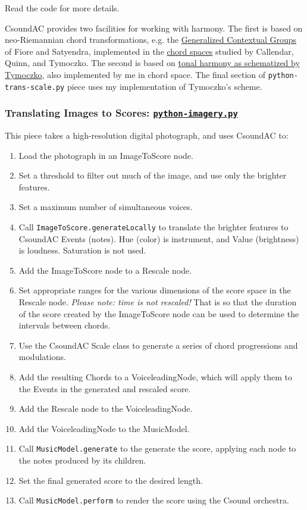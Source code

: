 \documentclass[letterpaper,10pt,DIV=12,parskip=half]{scrartcl}
\begin{document}
Read the code for more details.

\begin{canaryframed}
CsoundAC provides two facilities for working with harmony. The first is based on neo-Riemannian chord transformations, e.g. the \href{https://www.mtosmt.org/issues/mto.05.11.3/mto.05.11.3.fiore_satyendra.pdf}{Generalized Contextual Groups} of Fiore and Satyendra, implemented in the \href{https://dmitri.mycpanel.princeton.edu/files/publications/science2.pdf}{chord spaces} studied by Callendar, Quinn, and Tymoczko. The second is based on \href{https://doi.org/10.1093/oso/9780197577103.001.0001}{tonal harmony as schematized by Tymoczko}, also implemented by me in chord space. The final section of \lstinline|python-trans-scale.py| piece uses my implementation of Tymoczko's scheme.
\end{canaryframed}

\subsubsection{Translating Images to Scores:  \href{https://github.com/gogins/csound-ac/blob/master/user-guide/python-imagery.py}{\lstinline|python-imagery.py|}}

This piece takes a high-resolution digital photograph, and uses CsoundAC to:

\begin{enumerate}
\item Load the photograph in an ImageToScore node.
\item Set a threshold to filter out much of the image, and use only the brighter features.
\item Set a maximum number of simultaneous voices.
\item Call \lstinline|ImageToScore.generateLocally| to translate the brighter features to CsoundAC Events (notes). Hue (color) is instrument, and Value (brightness) is loudness. Saturation is not used.
\item Add the ImageToScore node to a Rescale node.
\item Set appropriate ranges for the various dimensions of the score space in the Rescale node. \emph{Please note: time is not rescaled!} That is so that the duration of the score created by the ImageToScore node can be used to determine the intervals between chords.
\item Use the CsoundAC Scale class to generate a series of chord progressions and modulations.
\item Add the resulting Chords to a VoiceleadingNode, which will apply them to the Events in the generated and rescaled score.
\item Add the Rescale node to the VoiceleadingNode.
\item Add the VoiceleadingNode to the MusicModel.
\item Call \lstinline|MusicModel.generate| to the generate the score, applying each node to the notes produced by its children.
\item Set the final generated score to the desired length.
\item Call \lstinline|MusicModel.perform| to render the score using the Csound orchestra.
\end{enumerate}
\end{document}
